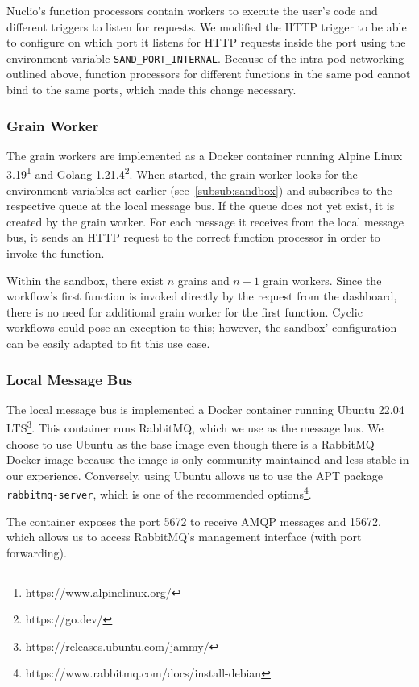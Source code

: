 Nuclio's function processors contain workers to execute the user's code and different triggers to listen for requests.
We modified the HTTP trigger to be able to configure on which port it listens for HTTP requests inside the port using the environment variable \texttt{SAND\_PORT\_INTERNAL}.
Because of the intra-pod networking outlined above, function processors for different functions in the same pod cannot bind to the same ports, which made this change necessary.


\subsubsection{Grain Worker}

The grain workers are implemented as a Docker container running Alpine Linux 3.19\footnote{https://www.alpinelinux.org/} and Golang 1.21.4\footnote{https://go.dev/}.
When started, the grain worker looks for the environment variables set earlier (see~\ref{subsub:sandbox}) and subscribes to the respective queue at the local message bus.
If the queue does not yet exist, it is created by the grain worker.
For each message it receives from the local message bus, it sends an HTTP request to the correct function processor in order to invoke the function.

Within the sandbox, there exist $n$ grains and $n-1$ grain workers.
Since the workflow's first function is invoked directly by the request from the dashboard, there is no need for additional grain worker for the first function.
Cyclic workflows could pose an exception to this; however, the sandbox' configuration can be easily adapted to fit this use case.

\subsubsection{Local Message Bus}

The local message bus is implemented a Docker container running Ubuntu 22.04 LTS\footnote{https://releases.ubuntu.com/jammy/}.
This container runs RabbitMQ, which we use as the message bus. 
We choose to use Ubuntu as the base image even though there is a RabbitMQ Docker image because the image is only community-maintained and less stable in our experience.
Conversely, using Ubuntu allows us to use the APT package \texttt{rabbitmq-server}, which is one of the recommended options\footnote{https://www.rabbitmq.com/docs/install-debian}.

The container exposes the port 5672 to receive AMQP messages and 15672, which allows us to access RabbitMQ's management interface (with port forwarding). 

